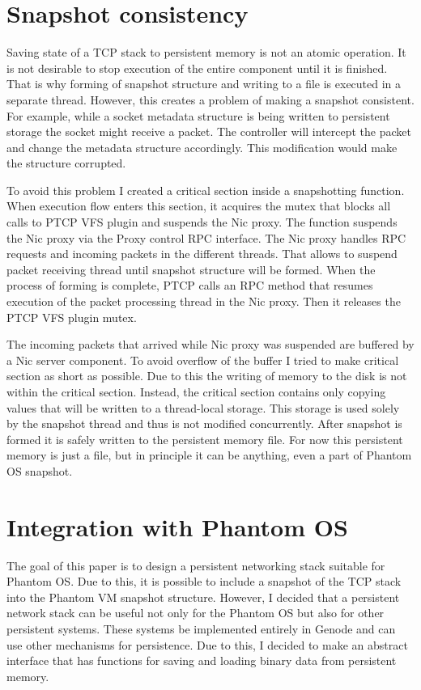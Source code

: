 \section{Snapshot consistency}

Saving state of a TCP stack to persistent memory is not an atomic operation. It
is not desirable to stop execution of the entire component until it is
finished. That is why forming of snapshot structure and writing to a file is
executed in a separate thread. However, this creates a problem of making a
snapshot consistent. For example, while a socket metadata structure is being
written to persistent storage the socket might receive a packet. The controller
will intercept the packet and change the metadata structure accordingly. This
modification would make the structure corrupted. 

To avoid this problem I created a critical section inside a snapshotting
function. When execution flow enters this section, it acquires the mutex that
blocks all calls to PTCP VFS plugin and suspends the Nic proxy. The function
suspends the Nic proxy via the Proxy control RPC interface. The Nic proxy 
handles RPC requests and incoming packets in the different threads. That allows
to suspend packet receiving thread until snapshot structure will be formed.
When the process of forming is complete, PTCP calls an RPC method that resumes
execution of the packet processing thread in the Nic proxy. Then it releases
the PTCP VFS plugin mutex. 

The incoming packets that arrived while Nic proxy was suspended are buffered by
a Nic server component. To avoid overflow of the buffer I tried to make
critical section as short as possible. Due to this the writing of memory to the
disk is not within the critical section. Instead, the critical section contains
only copying values that will be written to a thread-local storage. This
storage is used solely by the snapshot thread and thus is not modified
concurrently. After snapshot is formed it is safely written to the persistent
memory file. For now this persistent memory is just a file, but in principle it
can be anything, even a part of Phantom OS snapshot.

\section{Integration with Phantom OS}

The goal of this paper is to design a persistent networking stack suitable for
Phantom OS. Due to this, it is possible to include a snapshot of the TCP stack
into the Phantom VM snapshot structure. However, I decided that a persistent
network stack can be useful not only for the Phantom OS but also for other
persistent systems. These systems be implemented entirely in Genode and can use
other mechanisms for persistence. Due to this, I decided to make an abstract
interface that has functions for saving and loading binary data from persistent
memory.

